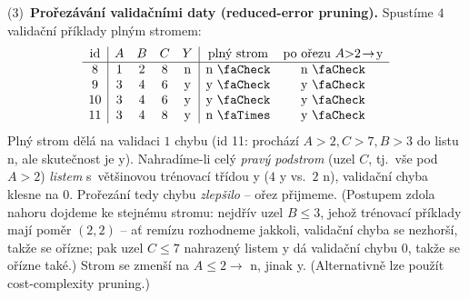 \begin{priklad}
\smallskip
(3)~\textbf{Prořezávání validačními daty (reduced-error pruning).} Spustíme $4$ validační příklady plným stromem:
\[
\begin{array}{c|cccc|cc}
\text{id} & A & B & C & Y & \text{plný strom} & \text{po ořezu } A{>}2\!\to\!\text{y} \\\hline
8  & 1 & 2 & 8 & \text{n} & \text{n \faCheck} & \text{n \faCheck} \\
9  & 3 & 4 & 6 & \text{y} & \text{y \faCheck} & \text{y \faCheck} \\
10 & 3 & 4 & 6 & \text{y} & \text{y \faCheck} & \text{y \faCheck} \\
11 & 3 & 4 & 8 & \text{y} & \text{n \faTimes} & \text{y \faCheck}
\end{array}
\]
Plný strom dělá na validaci $1$ chybu (id 11: prochází $A{>}2,C{>}7,B{>}3$ do listu n, ale skutečnost je y). Nahradíme-li celý \emph{pravý podstrom} (uzel $C$, tj.\ vše pod $A>2$) \emph{listem} s~většinovou trénovací třídou y ($4$ y vs.\ $2$ n), validační chyba klesne na $\boxed{0}$. Prořezání tedy chybu \emph{zlepšilo} -- ořez přijmeme. (Postupem zdola nahoru dojdeme ke stejnému stromu: nejdřív uzel $B\le 3$, jehož trénovací příklady mají poměr $(2,2)$ -- ať remízu rozhodneme jakkoli, validační chyba se nezhorší, takže se ořízne; pak uzel $C\le 7$ nahrazený listem y dá validační chybu $0$, takže se ořízne také.) Strom se zmenší na $A\le 2 \to$ n, jinak y. (Alternativně lze použít cost-complexity pruning.)
\end{priklad}

